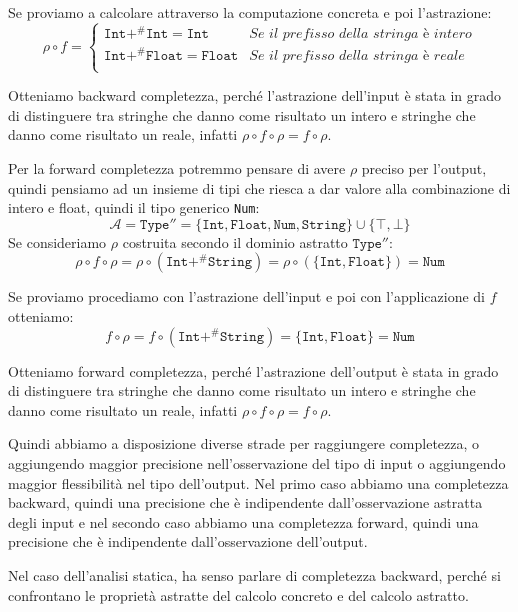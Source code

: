 Se proviamo a calcolare attraverso la computazione concreta e poi l'astrazione:
\[
    \rho \circ f = 
    \begin{cases}
        \texttt{Int} +^\# \texttt{Int} = \texttt{Int}  & \textit{Se il prefisso della stringa è intero}\\
        \texttt{Int} +^\# \texttt{Float} = \texttt{Float} & \textit{Se il prefisso della stringa è reale}\\
    \end{cases}
\]

Otteniamo backward completezza, perché l'astrazione dell'input è stata in grado di distinguere
tra stringhe che danno come risultato un intero e stringhe che danno come risultato un reale, 
infatti $\rho \circ f \circ \rho = f \circ \rho$.

Per la forward completezza potremmo pensare di avere $\rho$ preciso per l'output, quindi 
pensiamo ad un insieme di tipi che riesca a dar valore alla combinazione di intero e float, quindi 
il tipo generico \texttt{Num}:
\[
    \mathcal{A} = \texttt{Type}'' = \{\texttt{Int}, \texttt{Float}, \texttt{Num},
    \texttt{String}\} \cup \{\top, \bot\}
\]
Se consideriamo $\rho$ costruita secondo il dominio astratto $\texttt{Type}''$:
\[
    \rho \circ f \circ \rho = 
    \rho \circ (\texttt{Int} +^\# \texttt{String}) =
    \rho \circ (\{ \texttt{Int}, \texttt{Float} \})
    = \texttt{Num}
\]

Se proviamo procediamo con l'astrazione dell'input e poi con l'applicazione di $f$ otteniamo:
\[
    f \circ \rho = f \circ (\texttt{Int} +^\# \texttt{String}) =
    \{ \texttt{Int}, \texttt{Float} \} = \texttt{Num}
\]

Otteniamo forward completezza, perché l'astrazione dell'output è
stata in grado di distinguere tra stringhe che danno come risultato un intero e stringhe che
danno come risultato un reale, infatti $\rho \circ f \circ \rho = f \circ \rho$.

\begin{tcolorbox}[title =Raggiungimento di completezza]
    Quindi abbiamo a disposizione diverse strade per raggiungere completezza, o aggiungendo 
    maggior precisione nell'osservazione del tipo di input o aggiungendo maggior flessibilità 
    nel tipo dell'output. Nel primo caso abbiamo una completezza backward, quindi una precisione 
    che è indipendente dall'osservazione astratta degli input e nel secondo caso abbiamo una
    completezza forward, quindi una precisione che è indipendente dall'osservazione dell'output.
\end{tcolorbox}
Nel caso dell'analisi statica, ha senso parlare di completezza backward, perché 
si confrontano le proprietà astratte del calcolo concreto e del calcolo astratto.

